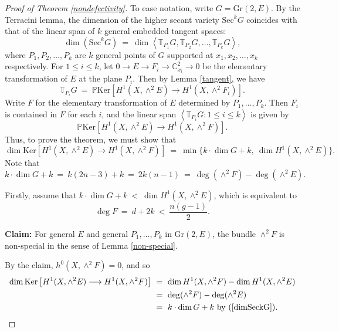 \documentclass[10pt]{amsart}
\numberwithin{equation}{section}
\newcommand{\pp}{\mathbb P}
\newcommand{\cc}{\mathbb C}
\newcommand{\bt}{\mathbb T}
\newcommand{\Ker}{\mathrm{Ker}}
\newcommand{\Sec}{\mathrm{Sec}}
\newcommand{\Gr}{\mathrm{Gr}}
\begin{document}
\begin{proof}[Proof of Theorem \ref{nondefectivity}] To ease notation, write $G = \Gr(2, E)$. By the Terracini lemma, the dimension of the higher secant variety $\Sec^k G$ coincides with that of the linear span of $k$ general embedded tangent spaces:
\[
\dim (\Sec^k G) \ = \ \dim \left< \bt_{P_1} G, \bt_{P_2}G, \ldots, \bt_{P_k}G \right>,
\]
where $P_1, P_2, \ldots, P_k$ are $k$ general points of $G$ supported at $x_1, x_2 , \ldots , x_k$ respectively. For $1 \le i \le k$, let $0 \to E \to F_i \to \cc^2_{x_i} \to 0$ be the elementary transformation of $E$ at the plane $P_i$. Then by Lemma \ref{tangent}, we have
\[
\bt_{P_i} G \ = \ \pp  \Ker \left[ H^1(X, \wedge^2 E) \longrightarrow H^1(X, \wedge^2 F_i) \right].
\]
Write $F$ for the elementary transformation of $E$ determined by $P_1, \ldots, P_k$. Then $F_i$ is contained in $F$ for each $i$, and the linear span $\left< \bt_{P_i} G : 1 \le i \le k \right>$ is given by 
\[
\pp \Ker \left[ H^1(X, \wedge^2 E) \longrightarrow H^1(X, \wedge^2 F) \right].
\]
Thus, to prove the theorem, we must show that
\[
\dim \Ker \left[ H^1(X, \wedge^2 E) \longrightarrow H^1(X, \wedge^2 F) \right] \ = \ \min \{ k \cdot \dim G + k, \ \dim H^1(X, \wedge^2 E) \}.
\]
Note that
\begin{equation}
k \cdot \dim G + k \ = \ k(2n-3) + k \ = \ 2k(n-1) \ = \ \deg (\wedge^2 F) - \deg (\wedge^2 E). \label{dimSeckG}
\end{equation}

Firstly, assume that $k \cdot \dim G + k  \ < \ \dim H^1(X, \wedge^2 E)$, which is equivalent to
\[ \deg F \ = \ d + 2k \ < \ \frac{n(g-1)}{2}. \]

\noindent \textbf{Claim:} For general $E$ and general $P_1 , \ldots, P_k$ in $\Gr(2, E)$, the bundle $\wedge^2 F$ is non-special in the sense of Lemma \ref{non-special}. 

By the claim, $h^0(X, \wedge^2 F) = 0$, and so
\[
\begin{split}
\dim \Ker \left[ H^1(X, \wedge^2 E) \longrightarrow H^1(X, \wedge^2 F) \right] \ &= \ \dim H^1(X, \wedge^2 F) - \dim H^1(X, \wedge^2 E) \\
&= \ \deg (\wedge^2 F) - \deg (\wedge^2 E) \\
&= \ k \cdot \dim G + k \hbox{ by (\ref{dimSeckG})}.
\end{split}
\]


\end{proof}
\end{document}
